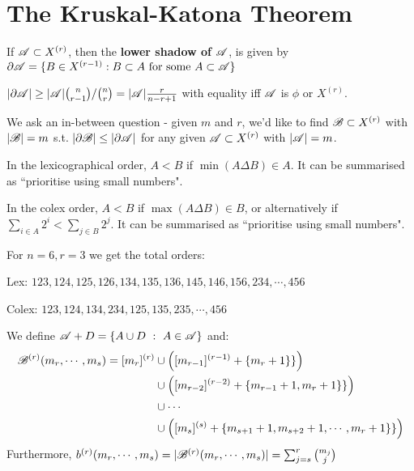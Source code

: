 \documentclass[a4paper]{article}
\begin{document}
\section{The Kruskal-Katona Theorem}
\begin{defi}
	If $\mathscr{A}\subset X^{(r)}$, then the \textbf{lower shadow of $\mathscr{A}$}, is given by $\partial\mathscr{A}=\{B\in X^{(r-1)}:B\subset A \textrm{ for some } A\subset\mathscr{A} \}$	
\end{defi}

\begin{fact}
	$|\partial\mathscr{A}|\geq|\mathscr{A}|\binom{n}{r-1}/\binom{n}{r}=|\mathscr{A}|\frac{r}{n-r+1}$ with equality iff $\mathscr{A}$ is $\phi$ or $X^{(r)}$.
\end{fact}

\begin{aim}
	We ask an in-between question - given $m$ and $r$, we'd like to find $\mathscr{B}\subset X^{(r)}$ with $|\mathscr{B}|=m$ s.t. $|\partial\mathscr{B}|\leq|\partial\mathscr{A}|$ for any given $\mathscr{A}\subset X^{(r)}$ with $|\mathscr{A}|=m$.
\end{aim}

\begin{defi}
	In the lexicographical order, $A<B$ if $\min(A\Delta B)\in A$. It can be summarised as ``prioritise using small numbers".
\end{defi}
\begin{defi}
	In the colex order, $A<B$ if $\max(A\Delta B)\in B$, or alternatively if $\sum_{i\in A}2^i<\sum_{j\in B}2^j$. It can be summarised as ``prioritise using small numbers".
\end{defi}
\begin{eg}
	For $n=6,r=3$ we get the total orders:
	
	Lex: $123,124,125,126,134,135,136,145,146,156,234,\cdots, 456$
	
	Colex: $123,124,134,234,125,135,235,\cdots, 456$
\end{eg}

\begin{notation}
	We define $\calA+D=\{A\cup D\ :\ A\in\calA\}$ and:
	\begin{align*}
		\mathscr{B}^{(r)}(m_r,\cdots,m_s)=[m_r]^{(r)}
				& \cup \left([m_{r-1}]^{(r-1)}+\{m_r+1\}\}\right)\\
				& \cup \left([m_{r-2}]^{(r-2)}+\{m_{r-1}+1, m_r+1\}\}\right)\\
				& \cup \cdots\\
				& \cup \left([m_s]^{(s)}+\{m_{s+1}+1,m_{s+2}+1,\cdots,m_r+1\}\}\right)
	\end{align*}
	Furthermore, $b^{(r)}(m_r,\cdots,m_s)=|\mathscr{B}^{(r)}(m_r,\cdots,m_s)|=\sum_{j=s}^{r}\binom{m_j}{j}$
\end{notation}
\end{document}
